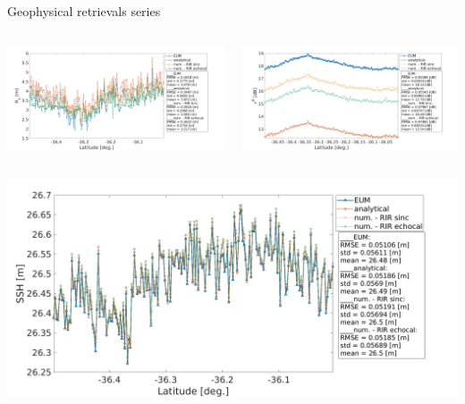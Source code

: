 \documentclass[compress,8pt]{beamer}
\begin{document}
\begin{frame}{Geophysical retrievals series}


 \begin{columns}
\begin{column}{0.5\textwidth}\centering

  \includegraphics[width=1.1\textwidth]{fig/S6A_P4_2_WAT_HR______20220906T193423_20220906T203036_20220930T170922_3373_067_096_048_EUM__OPE_NT_F07_isd_Hs}

  
\end{column}
\begin{column}{0.5\textwidth}\centering

  \includegraphics[width=1.1\textwidth]{fig/S6A_P4_2_WAT_HR______20220906T193423_20220906T203036_20220930T170922_3373_067_096_048_EUM__OPE_NT_F07_isd_sigma0}

  
\end{column}
\end{columns}

\medskip
 \begin{columns}
\begin{column}{0.5\textwidth}\centering

  \includegraphics[width=1.1\textwidth]{fig/S6A_P4_2_WAT_HR______20220906T193423_20220906T203036_20220930T170922_3373_067_096_048_EUM__OPE_NT_F07_isd_SSH} 
  

\end{column}
\end{columns}
\end{frame}
\end{document}
